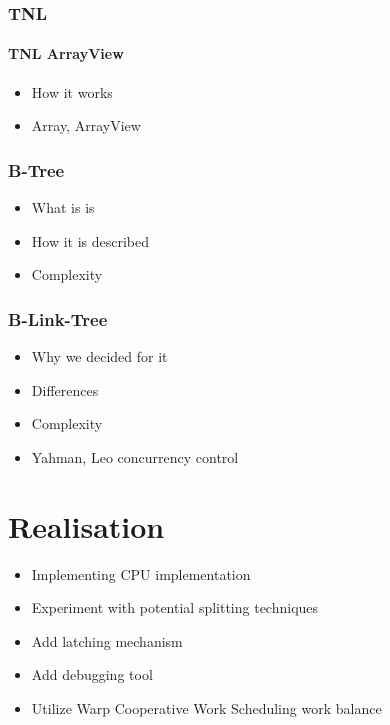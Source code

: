 \documentclass[thesis=B,english]{FITthesis}[2019/12/23]
\begin{document}
\subsection{TNL}

\subsubsection{TNL ArrayView}
\begin{itemize}
	\item How it works
	\item Array, ArrayView
\end{itemize}

\subsection{B-Tree}
\begin{itemize}
	\item What is is
	\item How it is described
	\item Complexity
\end{itemize}

\subsection{B-Link-Tree}
\begin{itemize}
	\item Why we decided for it
	\item Differences
	\item Complexity
	\item Yahman, Leo concurrency control
\end{itemize}


\chapter{Realisation}

\begin{itemize}
	\item Implementing CPU implementation
	\item Experiment with potential splitting techniques
	\item Add latching mechanism
	\item Add debugging tool
	\item Utilize Warp Cooperative Work Scheduling work balance
\end{itemize}

\end{document}
